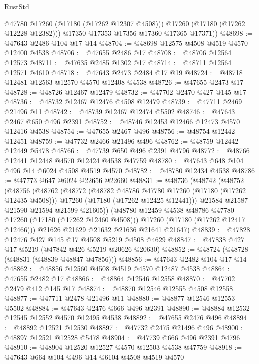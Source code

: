 \begin{lexlean}{RustStd}
\begin{coremodule}
{\begin{coremodule}
{{{{{{{{{{{{{{{{{{{{{{{{{{{{{{{{{{{{{{{{{{{{{{{{{{{{{{{            @47780
            @17260
            (@17180 (@17262 @12307 @4508)))
          @17260
          (@17180 (@17262 @12228 @12382)))
        @17350
        @17353
        @17356
        @17360
        @17365
        @17371))
@48698 := @47643 @2486 @104 @17 @14
@48704 := @48698 @12575 @4508 @4519 @4570 @12400 @4538
@48706 := @47655 @2486 @17
@48708 := @48706 @12564 @12573
@48711 := @47635 @2485 @1302 @17
@48714 := @48711 @12564 @12571 @4610
@48718 := @47643 @2473 @2484 @17 @19
@48724 := @48718 @12481 @12563 @12570 @4570 @12408 @4538
@48726 := @47655 @2473 @17
@48728 := @48726 @12467 @12479
@48732 := @47702 @2470 @427 @145 @17
@48736 := @48732 @12467 @12476 @4508 @12479
@48739 := @47711 @2469 @21496 @11
@48742 := @48739 @12467 @12474 @5502
@48746 := @47643 @2467 @650 @496 @2391
@48752 := @48746 @12453 @12466 @12473 @4570 @12416 @4538
@48754 := @47655 @2467 @496
@48756 := @48754 @12442 @12451
@48759 := @47732 @2466 @21496 @496
@48762 := @48759 @12442 @12449 @5478
@48766 := @47739 @650 @496 @2391 @4796
@48772 := @48766 @12441 @12448 @4570 @12424 @4538 @47759
@48780 := @47643 @648 @104 @496 @14 @6024 @4508 @4519 @4570
@48782 := @48780 @12434 @4538
@48786 := @47773 @647 @6024 @22656 @22660
@48831 := @48736
    (@48742
      (@48752
        (@48756
          (@48762
            (@48772
              (@48782 @48786 @47780 @17260 (@17180 (@17262 @12435 @4508)))
              @17260
              (@17180 (@17262 @12425 @12441)))
            @21584
            @21587
            @21590
            @21594
            @21599
            @21605))
        (@48780 @12459 @4538 @48786 @47780 @17260 (@17180 (@17262 @12460 @4508)))
        @17260
        (@17180 (@17262 @12417 @12466)))
      @21626
      @21629
      @21632
      @21636
      @21641
      @21647)
@48839 := @47828 @12476 @427 @145 @17 @4508 @5219 @4508 @4629
@48847 := @47838 @427 @17 @5219 (@47842 @426 @5219 @20626 @20630)
@48852 := @48724 (@48728 (@48831 (@48839 @48847 @47856)))
@48856 := @47643 @2482 @104 @17 @14
@48862 := @48856 @12560 @4508 @4519 @4570 @12487 @4538
@48864 := @47655 @2482 @17
@48866 := @48864 @12546 @12558
@48870 := @47702 @2479 @412 @145 @17
@48874 := @48870 @12546 @12555 @4508 @12558
@48877 := @47711 @2478 @21496 @11
@48880 := @48877 @12546 @12553 @5502
@48884 := @47643 @2476 @666 @496 @2391
@48890 := @48884 @12532 @12545 @12552 @4570 @12495 @4538
@48892 := @47655 @2476 @496
@48894 := @48892 @12521 @12530
@48897 := @47732 @2475 @21496 @496
@48900 := @48897 @12521 @12528 @5478
@48904 := @47739 @666 @496 @2391 @4796
@48910 := @48904 @12520 @12527 @4570 @12503 @4538 @47759
@48918 := @47643 @664 @104 @496 @14 @6104 @4508 @4519 @4570
}}}}}}}}}}}}}}}}}}}}}}}}}}}}}}}}}}}}}}}}}}}}}}}}}}}}}}}
\end{coremodule}}
\end{coremodule}
\end{lexlean}
